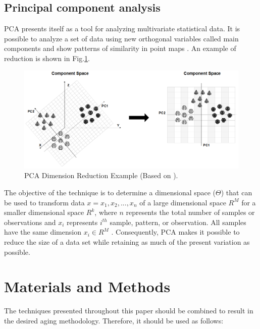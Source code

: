 \documentclass{ws-m3as}
\begin{document}
\subsection{Principal component analysis}

PCA presents itself as a tool for analyzing multivariate statistical data. It is possible to analyze a set of data using new orthogonal variables called main components and show patterns of similarity in point maps \cite{Mishra2017}. An example of reduction is shown in Fig.\ref{fig:5}.

\begin{figure}[H]
	\centering 
	\includegraphics[width=0.7\linewidth]{Figures/PCAExample2}
	\caption{PCA Dimension Reduction Example (Based on \protect\cite{Adcock2015}).}
	\label{fig:5}
\end{figure}

The objective of the technique is to determine a dimensional space ($\Theta$) that can be used to transform data $x={x_{1},x_{2},...,x_{n}}$ of a large dimensional space $R^{M}$ for a smaller dimensional space $R^{k}$, where $n$ represents the total number of samples or observations and $x_{i}$ represents $i^{th}$ sample, pattern, or observation. All samples have the same dimension $x_{i} \in R^{M}$ \cite{Tharwat2016}. Consequently, PCA makes it possible to reduce the size of a data set while retaining as much of the present variation as possible.

\section{Materials and Methods}

The techniques presented throughout this paper should be combined to result in the desired aging methodology. Therefore, it should be used as follows:
\end{document}
